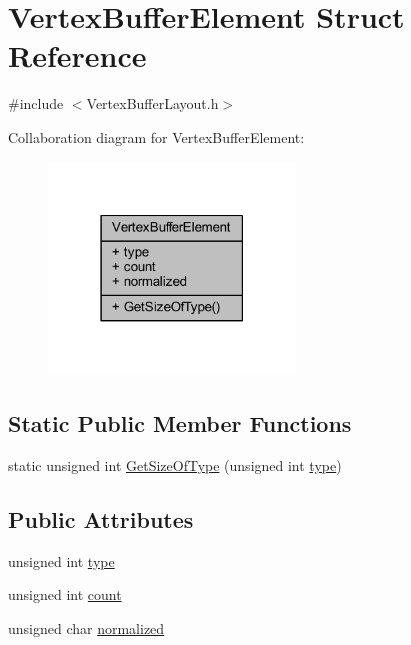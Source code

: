 \hypertarget{struct_vertex_buffer_element}{}\section{Vertex\+Buffer\+Element Struct Reference}
\label{struct_vertex_buffer_element}


{\ttfamily \#include $<$Vertex\+Buffer\+Layout.\+h$>$}



Collaboration diagram for Vertex\+Buffer\+Element\+:
\nopagebreak
\begin{figure}[H]
\begin{center}
\leavevmode
\includegraphics[width=186pt]{struct_vertex_buffer_element__coll__graph}
\end{center}
\end{figure}
\subsection*{Static Public Member Functions}
\begin{DoxyCompactItemize}
\item 
static unsigned int \mbox{\hyperlink{struct_vertex_buffer_element_a8465417a435f8bcd68a71bc414f1d0ee}{Get\+Size\+Of\+Type}} (unsigned int \mbox{\hyperlink{struct_vertex_buffer_element_aebaf924b86871f57f006846ba7443676}{type}})
\end{DoxyCompactItemize}
\subsection*{Public Attributes}
\begin{DoxyCompactItemize}
\item 
unsigned int \mbox{\hyperlink{struct_vertex_buffer_element_aebaf924b86871f57f006846ba7443676}{type}}
\item 
unsigned int \mbox{\hyperlink{struct_vertex_buffer_element_af2d13355b799b11b6ffbc0a34fb03f8a}{count}}
\item 
unsigned char \mbox{\hyperlink{struct_vertex_buffer_element_aa5216544514d8d4c9baab824d6e48c06}{normalized}}
\end{DoxyCompactItemize}


